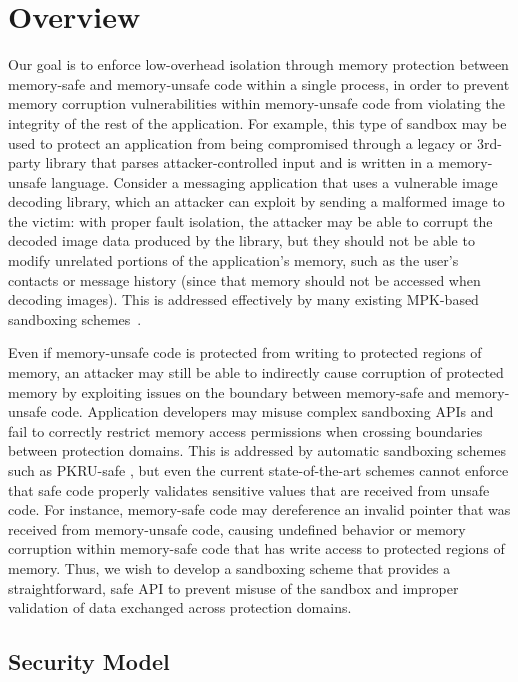 \chapter{Overview}

Our goal is to enforce low-overhead isolation through memory protection between memory-safe and
memory-unsafe code within a single process, in order to prevent memory corruption vulnerabilities
within memory-unsafe code from violating the integrity of the rest of the application. For example,
this type of sandbox may be used to protect an application from being compromised through a legacy
or 3rd-party library that parses attacker-controlled input and is written in a memory-unsafe
language. Consider a messaging application that uses a vulnerable image decoding library, which an
attacker can exploit by sending a malformed image to the victim: with proper fault isolation, the
attacker may be able to corrupt the decoded image data produced by the library, but they should not
be able to modify unrelated portions of the application's memory, such as the user's contacts or
message history (since that memory should not be accessed when decoding images). This is addressed
effectively by many existing MPK-based sandboxing schemes~\cite{vahldiek-oberwagner:erim,
hedayati:hodor, voulimeneas:cerberus, ghoshn:enclosure}.

Even if memory-unsafe code is protected from writing to protected regions of memory, an attacker may
still be able to indirectly cause corruption of protected memory by exploiting issues on the
boundary between memory-safe and memory-unsafe code. Application developers may misuse complex
sandboxing APIs and fail to correctly restrict memory access permissions when crossing boundaries
between protection domains. This is addressed by automatic sandboxing schemes such as PKRU-safe
\cite{kirth:pkru}, but even the current state-of-the-art schemes cannot enforce that safe code
properly validates sensitive values that are received from unsafe code. For instance, memory-safe
code may dereference an invalid pointer that was received from memory-unsafe code, causing undefined
behavior or memory corruption within memory-safe code that has write access to protected regions of
memory. Thus, we wish to develop a sandboxing scheme that provides a straightforward, safe API to
prevent misuse of the sandbox and improper validation of data exchanged across protection domains.

\section{Security Model}

